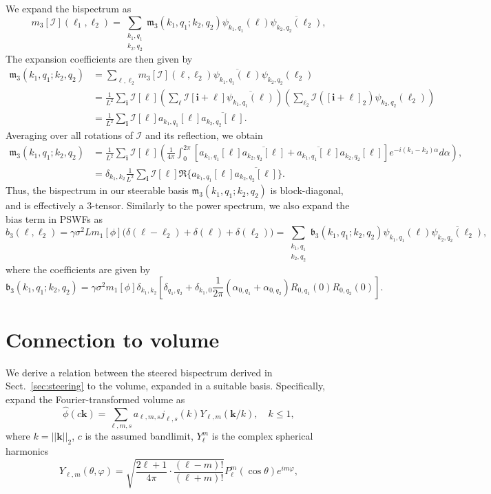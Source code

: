 \documentclass[english,11pt]{article}
\newcommand{\1}{\mathbf{1}}
\newcommand{\II}{\mathcal{I}}
\newcommand{\kk}{\textbf{k}}
\newcommand{\mb}{\mathbf}
\newcommand{\mk}{\mathfrak}
\newcommand*\Bell{\ensuremath{\boldsymbol\ell}}
\numberwithin{equation}{section}
\theoremstyle{plain}
\theoremstyle{definition}
\theoremstyle{remark}
\theoremstyle{plain}
\theoremstyle{remark}
\theoremstyle{plain}
\theoremstyle{plain}
\begin{document}
We expand the bispectrum as
\[ m_3[\II](\Bell_1, \Bell_2) = \sum_{\substack{k_1,q_1\\ k_2,q_2}}\mathfrak{m}_3(k_1,q_1;k_2,q_2)\psi_{k_1,q_1}(\Bell)\overline{\psi_{k_2,q_2}(\Bell_2)},\]
The expansion coefficients are then given by
\[\begin{aligned} \mathfrak{m}_3(k_1,q_1;k_2,q_2) &= \sum_{\Bell, \Bell_2}m_3[\II](\Bell,\Bell_2)\overline{\psi_{k_1,q_1}(\Bell)}\psi_{k_2,q_2}(\Bell_2)\\
&= \frac{1}{L^2}\sum_{\mb i}\II[\Bell]\left(\sum_{\Bell}\II[\mb i+\Bell]\overline{\psi_{k_1,q_1}(\Bell)}\right)\left(\sum_{\Bell_2}\II([\mb i+\Bell]_2)\psi_{k_2,q_2}(\Bell_2)\right)\\
&= \frac{1}{L^2}\sum_{\mb i}\II[\Bell] a_{k_1,q_1}[\Bell]\overline{a_{k_2,q_2}[\Bell]}.
\end{aligned}\]
Averaging over all rotations of $\II$ and its reflection, we obtain
\[\begin{aligned} \mathfrak{m}_3(k_1,q_1;k_2,q_2) &= \frac{1}{L^2}\sum_{\mb i}\II[\Bell]\left(\frac{1}{4\pi}\int_0^{2\pi}\left[a_{k_1,q_1}[\Bell]\overline{a_{k_2,q_2}[\Bell]} + \overline{a_{k_1,q_1}[\Bell]}a_{k_2,q_2}[\Bell]\right]e^{-i(k_1-k_2)\alpha}d\alpha\right),\\
&= \delta_{k_1,k_2}\frac{1}{L^2}\sum_{\mb i}\II[\Bell]\Re\{a_{k_1,q_1}[\Bell]\overline{a_{k_2,q_2}[\Bell]}\}.\end{aligned}\]
Thus, the bispectrum in our steerable basis $\mathfrak{m}_3(k_1,q_1;k_2,q_2)$ is block-diagonal, and is effectively a 3-tensor.
Similarly to the power spectrum, we also expand the bias term in PSWFs as
\[ b_3(\Bell, \Bell_2) =  \gamma\sigma^2Lm_1[\phi]\Big(\delta(\Bell - \Bell_2) +
\delta(\Bell) + \delta(\Bell_2)\Big) = \sum_{\substack{k_1, q_1\\ k_2, q_2}} \mk 
b_3(k_1,q_1; k_2, q_2)\psi_{k_1,q_1}(\Bell)\overline{\psi_{k_2,q_2}(\Bell_2)},\]
where the coefficients are given by
\[ \mk b_3(k_1,q_1; k_2,q_2) = \gamma\sigma^2 m_1[\phi]\delta_{k_1,k_2}\left[\delta_{q_1,q_2} + \delta_{k_1,0}\frac{1}{2\pi}(\alpha_{0,q_1} + \alpha_{0,q_2})R_{0,q_1}(0)R_{0,q_2}(0)\right]. \]
\section{Connection to volume}

We derive a relation between the steered bispectrum derived in Sect.~\ref{sec:steering} to the volume, expanded in a suitable basis. Specifically, expand the Fourier-transformed volume as
\[ \widehat \phi(c\kk) = \sum_{\ell,m,s}a_{\ell,m,s}j_{\ell,s}(k)Y_{\ell,m}(\kk/k),\quad k\leq 1,\]
where $k=||\kk||_2$, $c$ is the assumed bandlimit, $Y_{\ell}^m$ is the complex spherical harmonics
\[ Y_{\ell,m}(\theta,\varphi) = \sqrt{\frac{2\ell+1}{4\pi}\cdot\frac{(\ell-m)!}{(\ell+m)!}}P_{\ell}^m(\cos\theta)e^{i m\varphi},\]
\end{document}

